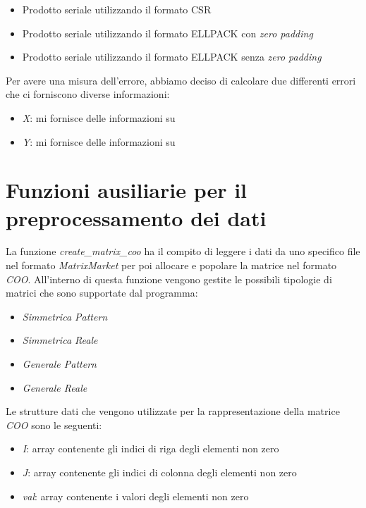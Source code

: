 \documentclass{article}
\begin{document}
\begin{itemize}
\item Prodotto seriale utilizzando il formato CSR
\item Prodotto seriale utilizzando il formato ELLPACK con \textit{zero padding}
\item Prodotto seriale utilizzando il formato ELLPACK senza \textit{zero padding}
\end{itemize}

Per avere una misura dell'errore, abbiamo deciso di calcolare due differenti errori che ci forniscono diverse informazioni:
\begin{itemize}
\item \textit{X}: mi fornisce delle informazioni su
\item \textit{Y}: mi fornisce delle informazioni su
\end{itemize}

\section{Funzioni ausiliarie per il preprocessamento dei dati}
La funzione \textit{create\_matrix\_coo} ha il compito di leggere i dati da uno specifico file nel formato \textit{MatrixMarket} per poi allocare e popolare la matrice nel formato \textit{COO}. All'interno di questa funzione vengono gestite le possibili tipologie di matrici che sono supportate dal programma:

\begin{itemize}
\item \textit{Simmetrica Pattern}
\item \textit{Simmetrica Reale}
\item \textit{Generale Pattern}
\item \textit{Generale Reale}
\end{itemize}

Le strutture dati che vengono utilizzate per la rappresentazione della matrice \textit{COO} sono le seguenti:

\begin{itemize}
\item \textit{I}: array contenente gli indici di riga degli elementi non zero
\item\textit{J}: array contenente gli indici di colonna degli elementi non zero
\item \textit{val}: array contenente i valori degli elementi non zero
\end{itemize}
\end{document}
